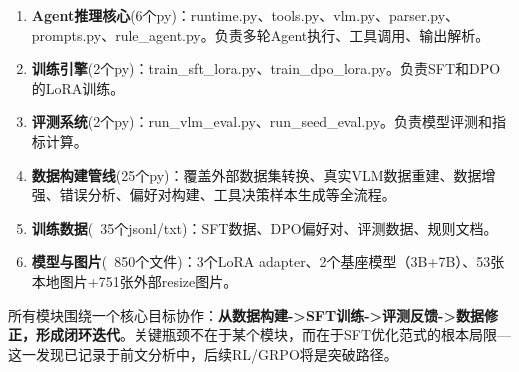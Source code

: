 \documentclass[fontset=none,11pt,a4paper]{ctexart}
\begin{document}
\begin{enumerate}[nosep]
    \item \textbf{Agent推理核心}(6个py)：runtime.py、tools.py、vlm.py、parser.py、prompts.py、rule\_agent.py。负责多轮Agent执行、工具调用、输出解析。
    \item \textbf{训练引擎}(2个py)：train\_sft\_lora.py、train\_dpo\_lora.py。负责SFT和DPO的LoRA训练。
    \item \textbf{评测系统}(2个py)：run\_vlm\_eval.py、run\_seed\_eval.py。负责模型评测和指标计算。
    \item \textbf{数据构建管线}(25个py)：覆盖外部数据集转换、真实VLM数据重建、数据增强、错误分析、偏好对构建、工具决策样本生成等全流程。
    \item \textbf{训练数据}(~35个jsonl/txt)：SFT数据、DPO偏好对、评测数据、规则文档。
    \item \textbf{模型与图片}(~850个文件)：3个LoRA adapter、2个基座模型（3B+7B）、53张本地图片+751张外部resize图片。
\end{enumerate}

所有模块围绕一个核心目标协作：\textbf{从数据构建->SFT训练->评测反馈->数据修正，形成闭环迭代}。关键瓶颈不在于某个模块，而在于SFT优化范式的根本局限---这一发现已记录于前文分析中，后续RL/GRPO将是突破路径。
\end{document}
